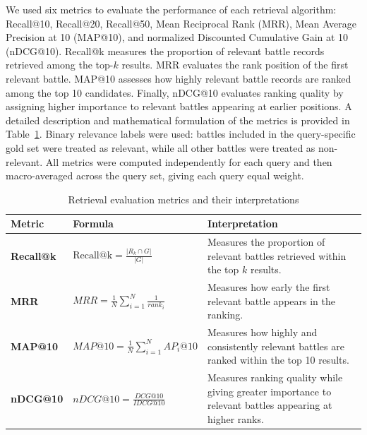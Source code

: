 We used six metrics to evaluate the performance of each retrieval algorithm: Recall@10, Recall@20, Recall@50, Mean Reciprocal Rank (MRR), Mean Average Precision at 10 (MAP@10), and normalized Discounted Cumulative Gain at 10 (nDCG@10). Recall@k measures the proportion of relevant battle records retrieved among the top-$k$ results. MRR evaluates the rank position of the first relevant battle. MAP@10 assesses how highly relevant battle records are ranked among the top 10 candidates. Finally, nDCG@10 evaluates ranking quality by assigning higher importance to relevant battles appearing at earlier positions. A detailed description and mathematical formulation of the metrics is provided in Table~\ref{tab:retrieval_metrics}. Binary relevance labels were used: battles included in the query-specific gold set were treated as relevant, while all other battles were treated as non-relevant. All metrics were computed independently for each query and then macro-averaged across the query set, giving each query equal weight.
\begin{table}[htbp]
    \centering
    \caption{Retrieval evaluation metrics and their interpretations}
    \label{tab:retrieval_metrics}

    \small
    \renewcommand{\arraystretch}{1.8}
    \setlength{\tabcolsep}{6pt}

    \begin{tabular}{
        >{\raggedright\arraybackslash}p{}
        >{\centering\arraybackslash}p{}
        >{\raggedright\arraybackslash}p{}
    }
        \toprule
        \textbf{Metric} &
        \textbf{Formula} &
        \textbf{Interpretation} \\
        \midrule

        \textbf{Recall@k} &
        $\displaystyle
        \mathrm{Recall@k} =
        \frac{|R_k \cap G|}{|G|}
        $ &
        Measures the proportion of relevant battles retrieved
        within the top $k$ results. \\
        \midrule

        \textbf{MRR} &
        $\displaystyle
        MRR = \frac{1}{N}
        \sum_{i=1}^{N}
        \frac{1}{rank_i}
        $ &
        Measures how early the first relevant battle appears
        in the ranking. \\
        \midrule

        \textbf{MAP@10} &
        $\displaystyle
        MAP@10 = \frac{1}{N}
        \sum_{i=1}^{N} AP_i@10
        $ &
        Measures how highly and consistently relevant battles
        are ranked within the top 10 results. \\
        \midrule

        \textbf{nDCG@10} &
        $\displaystyle
        nDCG@10 =
        \frac{DCG@10}{IDCG@10}
        $ &
        Measures ranking quality while giving greater
        importance to relevant battles appearing at
        higher ranks. \\

        \bottomrule
    \end{tabular}
\end{table}
